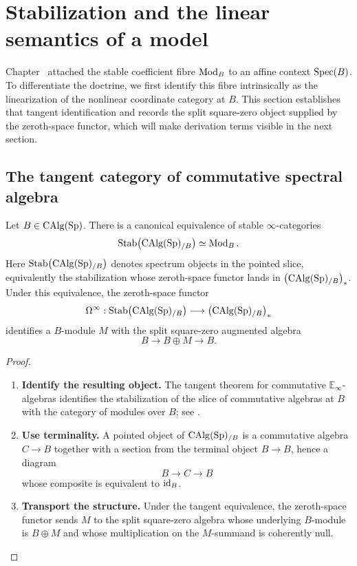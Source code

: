 \section{Stabilization and the linear semantics of a model}
\label{sec:tangent-semantics}

Chapter~ attached the stable coefficient
fibre \(\operatorname{Mod}_B\) to an affine context \(\operatorname{Spec}(B)\). To differentiate the
doctrine, we first identify this fibre intrinsically as the linearization of
the nonlinear coordinate category at \(B\). This section establishes that
tangent identification and records the split square-zero object supplied by
the zeroth-space functor, which will make derivation terms visible in the next
section.

\subsection{The tangent category of commutative spectral algebra}

\begin{theorem}
\label{thm:tangent-category-calg}
Let \(B\in\operatorname{CAlg}(\operatorname{Sp})\). There is a canonical equivalence of stable
\(\infty\)-categories
\[
    \operatorname{Stab}\bigl(\operatorname{CAlg}(\operatorname{Sp})_{/B}\bigr)
    \simeq
    \operatorname{Mod}_B.
\]
Here \(\operatorname{Stab}\bigl(\operatorname{CAlg}(\operatorname{Sp})_{/B}\bigr)\) denotes spectrum
objects in the pointed slice, equivalently the stabilization whose zeroth-space
functor lands in \(\bigl(\operatorname{CAlg}(\operatorname{Sp})_{/B}\bigr)_*\).
Under this equivalence, the zeroth-space functor
\[
    \Omega^\infty
    :
    \operatorname{Stab}\bigl(\operatorname{CAlg}(\operatorname{Sp})_{/B}\bigr)
    \longrightarrow
    \bigl(\operatorname{CAlg}(\operatorname{Sp})_{/B}\bigr)_*
\]
identifies a \(B\)-module \(M\) with the split square-zero augmented algebra
\[
    B
    \longrightarrow
    B\oplus M
    \longrightarrow
    B.
\]
\end{theorem}

\begin{proof}
\leavevmode
\begin{enumerate}[label=\textup{(\arabic*)}]
    \item \textbf{Identify the resulting object.}
    The tangent theorem for commutative \(\mathbb E_\infty\)-algebras identifies the stabilization of the
    slice of commutative algebras at \(B\) with the category of modules over \(B\);
    see \cite{LurieHigherAlgebra,LurieDAGIV}.

    \item \textbf{Use terminality.}
    A pointed object of \(\operatorname{CAlg}(\operatorname{Sp})_{/B}\) is a commutative algebra \(C\to B\) together with a section
    from the terminal object \(B\to B\), hence a diagram
    \[
        B\longrightarrow C\longrightarrow B
    \]
    whose composite is equivalent to \(\operatorname{id}_B\).

    \item \textbf{Transport the structure.}
    Under the tangent equivalence, the zeroth-space functor sends \(M\) to the split
    square-zero algebra whose underlying \(B\)-module is \(B\oplus M\) and whose
    multiplication on the \(M\)-summand is coherently null.
\end{enumerate}
\end{proof}

